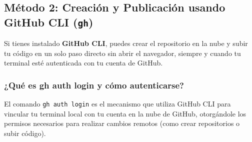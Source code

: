 \documentclass[
10pt, %
a4paper, %
oneside, %
headinclude,footinclude, %
BCOR5mm, %
]{scrartcl}
\begin{document}
\subsection{Método 2: Creación y Publicación usando GitHub CLI (\texttt{gh})}
Si tienes instalado \textbf{GitHub CLI}, puedes crear el repositorio en la nube y subir tu código en un solo paso directo sin abrir el navegador, siempre y cuando tu terminal esté autenticada con tu cuenta de GitHub.

\subsubsection{¿Qué es gh auth login y cómo autenticarse?}
El comando \texttt{gh auth login} es el mecanismo que utiliza GitHub CLI para vincular tu terminal local con tu cuenta en la nube de GitHub, otorgándole los permisos necesarios para realizar cambios remotos (como crear repositorios o subir código).
\end{document}
